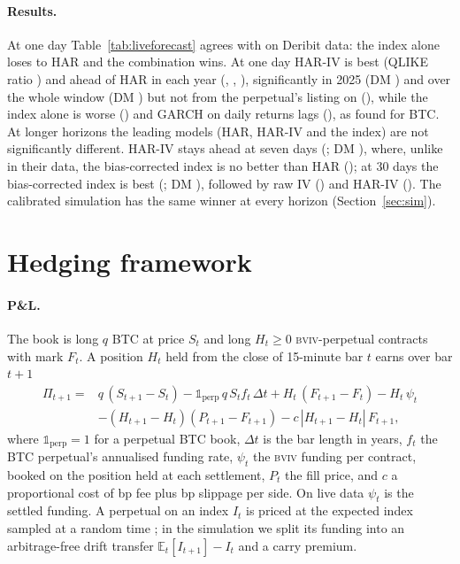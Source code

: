\documentclass[10pt,a4paper]{article}
\newcommand{\E}{\mathbb{E}}
\newcommand{\BVIV}{\textsc{bviv}}
\begin{document}
\paragraph{Results.} At one day Table~\ref{tab:liveforecast} agrees with \citet{hoang2020forecasting} on Deribit data: the index alone loses to HAR and the combination wins. At one day HAR-IV is best (QLIKE ratio \LiveQlOne) and ahead of HAR in each year (\LiveQlYearA, \LiveQlYearB, \LiveQlYearC), significantly in 2025 (DM \LiveDmYearB) and over the whole window (DM \LiveDmOne) but not from the perpetual's listing on (\LiveDmOneListing), while the index alone is worse (\LiveQlIvOne) and GARCH on daily returns lags (\LiveQlGarchOne), as \citet{bergsli2022forecasting} found for BTC. At longer horizons the leading models (HAR, HAR-IV and the index) are not significantly different. HAR-IV stays ahead at seven days (\LiveQlSeven; DM \LiveDmSeven), where, unlike in their data, the bias-corrected index is no better than HAR (\LiveQlIvSeven); at 30 days the bias-corrected index is best (\LiveQlThirty; DM \LiveDmThirty), followed by raw IV (\LiveQlRawThirty) and HAR-IV (\LiveQlHarThirty). The calibrated simulation has the same winner at every horizon (Section~\ref{sec:sim}).

\section{Hedging framework}\label{sec:hedge}

\paragraph{P\&L.} The book is long $q$ BTC at price $S_t$ and long $H_t\ge0$ \BVIV{}-perpetual contracts with mark $F_t$. A position $H_t$ held from the close of 15-minute bar $t$ earns over bar $t{+}1$
\begin{equation}\label{eq:pnl}
\begin{split}
\Pi_{t+1}={}&q\,(S_{t+1}-S_t)-\mathbb{1}_{\text{perp}}\,q\,S_t f_t\,\Delta t+H_t\,(F_{t+1}-F_t)-H_t\,\psi_t\\
&-(H_{t+1}-H_t)(P_{t+1}-F_{t+1})-c\,|H_{t+1}-H_t|\,F_{t+1},
\end{split}
\end{equation}
where $\mathbb{1}_{\text{perp}}=1$ for a perpetual BTC book, $\Delta t$ is the bar length in years, $f_t$ the BTC perpetual's annualised funding rate, $\psi_t$ the \BVIV{} funding per contract, booked on the position held at each settlement, $P_t$ the fill price, and $c$ a proportional cost of \Fee{} bp fee plus \Slip{} bp slippage per side. On live data $\psi_t$ is the settled funding. A perpetual on an index $I_t$ is priced at the expected index sampled at a random time \citep{he2022perpetual,ackerer2025perpetual}; in the simulation we split its funding into an arbitrage-free drift transfer $\E_t[I_{t+1}]-I_t$ and a carry premium.
\end{document}

